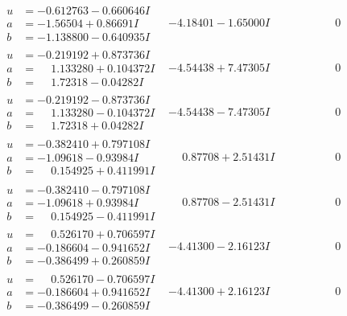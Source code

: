 \documentclass[1p]{elsarticle_modified}
\theoremstyle{definition}
\begin{document}
$$\begin{array}{c|c|c}
\begin{aligned}
u &= -0.612763 - 0.660646 I \\
a &= -1.56504 + 0.86691 I \\
b &= -1.138800 - 0.640935 I\end{aligned}
 & -4.18401 - 1.65000 I & \phantom{-0.000000 } 0 \\ \hline\begin{aligned}
u &= -0.219192 + 0.873736 I \\
a &= \phantom{-}1.133280 + 0.104372 I \\
b &= \phantom{-}1.72318 - 0.04282 I\end{aligned}
 & -4.54438 + 7.47305 I & \phantom{-0.000000 } 0 \\ \hline\begin{aligned}
u &= -0.219192 - 0.873736 I \\
a &= \phantom{-}1.133280 - 0.104372 I \\
b &= \phantom{-}1.72318 + 0.04282 I\end{aligned}
 & -4.54438 - 7.47305 I & \phantom{-0.000000 } 0 \\ \hline\begin{aligned}
u &= -0.382410 + 0.797108 I \\
a &= -1.09618 - 0.93984 I \\
b &= \phantom{-}0.154925 + 0.411991 I\end{aligned}
 & \phantom{-}0.87708 + 2.51431 I & \phantom{-0.000000 } 0 \\ \hline\begin{aligned}
u &= -0.382410 - 0.797108 I \\
a &= -1.09618 + 0.93984 I \\
b &= \phantom{-}0.154925 - 0.411991 I\end{aligned}
 & \phantom{-}0.87708 - 2.51431 I & \phantom{-0.000000 } 0 \\ \hline\begin{aligned}
u &= \phantom{-}0.526170 + 0.706597 I \\
a &= -0.186604 - 0.941652 I \\
b &= -0.386499 + 0.260859 I\end{aligned}
 & -4.41300 - 2.16123 I & \phantom{-0.000000 } 0 \\ \hline\begin{aligned}
u &= \phantom{-}0.526170 - 0.706597 I \\
a &= -0.186604 + 0.941652 I \\
b &= -0.386499 - 0.260859 I\end{aligned}
 & -4.41300 + 2.16123 I & \phantom{-0.000000 } 0 \\ \hline\begin{aligned}

\end{aligned}
\end{array}$$
\end{document}
